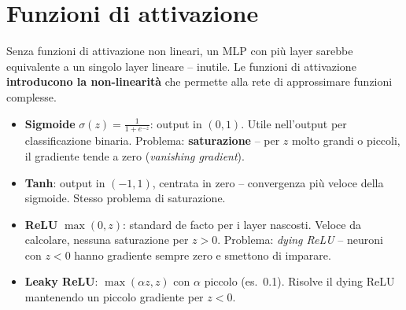\section{Funzioni di attivazione}

Senza funzioni di attivazione non lineari, un MLP con più layer sarebbe equivalente a un singolo layer lineare -- inutile. Le funzioni di attivazione \textbf{introducono la non-linearità} che permette alla rete di approssimare funzioni complesse.

\begin{center}
\end{center}

\begin{itemize}
    \item \textbf{Sigmoide} $\sigma(z) = \frac{1}{1+e^{-z}}$: output in $(0,1)$. Utile nell'output per classificazione binaria. Problema: \textbf{saturazione} -- per $z$ molto grandi o piccoli, il gradiente tende a zero (\emph{vanishing gradient}).
    \item \textbf{Tanh}: output in $(-1,1)$, centrata in zero -- convergenza più veloce della sigmoide. Stesso problema di saturazione.
    \item \textbf{ReLU} $\max(0, z)$: standard de facto per i layer nascosti. Veloce da calcolare, nessuna saturazione per $z > 0$. Problema: \emph{dying ReLU} -- neuroni con $z < 0$ hanno gradiente sempre zero e smettono di imparare.
    \item \textbf{Leaky ReLU}: $\max(\alpha z, z)$ con $\alpha$ piccolo (es.\ 0.1). Risolve il dying ReLU mantenendo un piccolo gradiente per $z < 0$.
\end{itemize}

